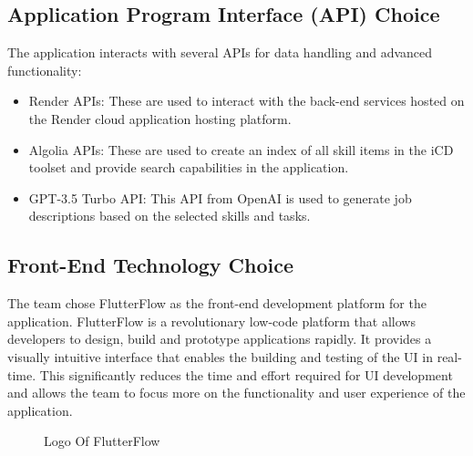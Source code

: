 \subsection{ Application Program Interface (API) Choice}
The application interacts with several APIs for data handling and advanced functionality:
\begin{itemize}
    \renewcommand\labelitemi{-}
    \item Render APIs: These are used to interact with the back-end services hosted on the Render cloud application hosting platform.
    \item Algolia APIs: These are used to create an index of all skill items in the iCD toolset and provide search capabilities in the application.
    \item GPT-3.5 Turbo API: This API from OpenAI is used to generate job descriptions based on the selected skills and tasks.
\end{itemize}

\subsection{Front-End Technology Choice}
The team chose {\color{purple} FlutterFlow} as the front-end development platform for the application. FlutterFlow is a revolutionary low-code platform that allows developers to design, build and prototype applications rapidly. It provides a visually intuitive interface that enables the building and testing of the UI in real-time. This significantly reduces the time and effort required for UI development and allows the team to focus more on the functionality and user experience of the application.

\begin{figure}[H]
    \centering
    \caption{  Logo Of FlutterFlow }
    \label{fig:FlutterFlow_Logo}
\end{figure}

